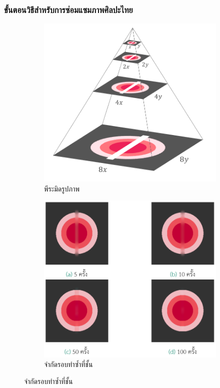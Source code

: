\documentclass[xcolor=dvipsnames, xetex,serif]{beamer}
\numberwithin{equation}{section}
\begin{document}
	\begin{frame}
		\frametitle{ขั้นตอนวิธีสำหรับการซ่อมแซมภาพศิลปะไทย}
		\begin{figure}[H]
			\centering
			\begin{subfigure}{0.4\linewidth}
				\centering
				\includegraphics[width=0.8\linewidth]{images/method_thaiart/image_pyramid.png}
				\caption*{{\large พีระมิดรูปภาพ}}
			\end{subfigure}
			\begin{subfigure}{0.4\linewidth}
				\centering
				\includegraphics[width=0.8\linewidth]{images/method_thaiart/just10enough.png}
				\caption*{{\large จำกัดรอบทำซ้ำที่ชั้น}}
			\end{subfigure}
		\end{figure}	
	\end{frame}
\end{document}
